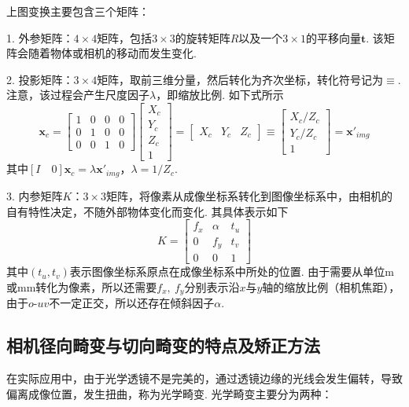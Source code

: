 \documentclass[12pt, a4paper, oneside]{ctexart}
\numberwithin{equation}{section}  %
\def\bd{\boldsymbol}        %
\def\Z{\mathbb{Z}}          %
\begin{document}
上图变换主要包含三个矩阵：

1. 外参矩阵：$4\times 4$矩阵，包括$3\times 3$的旋转矩阵$R$以及一个$3\times 1$的平移向量$\bd{t}$. 该矩阵会随着物体或相机的移动而发生变化.

2. 投影矩阵：$3\times 4$矩阵，取前三维分量，然后转化为齐次坐标，转化符号记为$\equiv$. 注意，该过程会产生尺度因子$\lambda$，即缩放比例. 如下式所示
\begin{equation*}
    [I\quad 0]\bd{x}_c = \left[\begin{matrix}
        1&0&0&0\\0&1&0&0\\0&0&1&0
    \end{matrix}\right]
    \left[\begin{matrix}
        X_c\\Y_c\\Z_c\\1
    \end{matrix}\right]=\left[\begin{matrix}
        X_c&Y_c&Z_c
    \end{matrix}\right]\equiv\left[\begin{matrix}
        X_c/Z_c\\Y_c/Z_c\\1
    \end{matrix}\right] = \bd{x}'_{img}
\end{equation*}
其中$[I\quad 0]\bd{x}_c = \lambda \bd{x}'_{img}$，$\lambda = 1/Z_c$.

3. 内参矩阵$K$：$3\times 3$矩阵，将像素从成像坐标系转化到图像坐标系中，由相机的自有特性决定，不随外部物体变化而变化. 其具体表示如下
\begin{equation*}
    K = \left[\begin{matrix}
        f_x&\alpha&t_u\\
        0&f_y&t_v\\
        0&0&1
    \end{matrix}\right]
\end{equation*}
其中$(t_u,t_v)$表示图像坐标系原点在成像坐标系中所处的位置. 由于需要从单位m或mm转化为像素，所以还需要$f_x,\ f_y$分别表示沿$x$与$y$轴的缩放比例（相机焦距），由于$o\text{-}uv$不一定正交，所以还存在倾斜因子$\alpha$.

\subsection{相机径向畸变与切向畸变的特点及矫正方法}
在实际应用中，由于光学透镜不是完美的，通过透镜边缘的光线会发生偏转，导致偏离成像位置，发生扭曲，称为光学畸变. 光学畸变主要分为两种：
\end{document}
